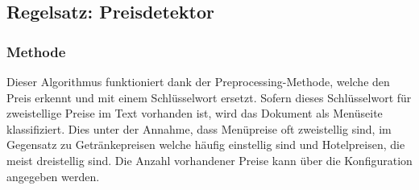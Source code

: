 \subsection{Regelsatz: Preisdetektor}
\subsubsection{Methode}
Dieser Algorithmus funktioniert dank der Preprocessing-Methode, welche den Preis erkennt und mit einem Schlüsselwort ersetzt.
Sofern dieses Schlüsselwort für zweistellige Preise im Text vorhanden ist, wird das Dokument als Menüseite klassifiziert. 
Dies unter der Annahme, dass Menüpreise oft zweistellig sind, im Gegensatz zu Getränkepreisen welche häufig einstellig sind und Hotelpreisen, die meist dreistellig sind.
Die Anzahl vorhandener Preise kann über die Konfiguration angegeben werden.
